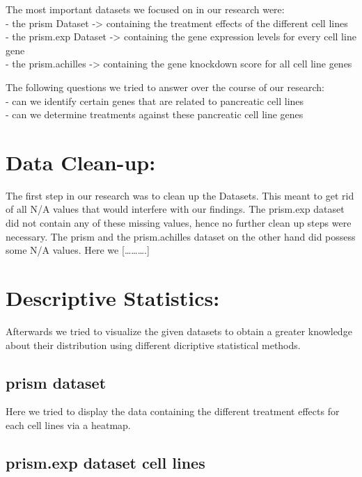\documentclass[
]{article}
\begin{document}
The most important datasets we focused on in our research were:\\
- the prism Dataset -\textgreater{} containing the treatment effects of
the different cell lines\\
- the prism.exp Dataset -\textgreater{} containing the gene expression
levels for every cell line gene\\
- the prism.achilles -\textgreater{} containing the gene knockdown score
for all cell line genes

The following questions we tried to answer over the course of our
research:\\
- can we identify certain genes that are related to pancreatic cell
lines\\
- can we determine treatments against these pancreatic cell line genes

\hypertarget{data-clean-up}{%
\section{Data Clean-up:}\label{data-clean-up}}

The first step in our research was to clean up the Datasets. This meant
to get rid of all N/A values that would interfere with our findings. The
prism.exp dataset did not contain any of these missing values, hence no
further clean up steps were necessary. The prism and the prism.achilles
dataset on the other hand did possess some N/A values. Here we
{[}\ldots\ldots\ldots.{]}

\hypertarget{descriptive-statistics}{%
\section{Descriptive Statistics:}\label{descriptive-statistics}}

Afterwards we tried to visualize the given datasets to obtain a greater
knowledge about their distribution using different dicriptive
statistical methods.

\hypertarget{prism-dataset}{%
\subsection{prism dataset}\label{prism-dataset}}

Here we tried to display the data containing the different treatment
effects for each cell lines via a heatmap.

\hypertarget{prism.exp-dataset-cell-lines}{%
\subsection{prism.exp dataset cell
lines}\label{prism.exp-dataset-cell-lines}}
\end{document}
